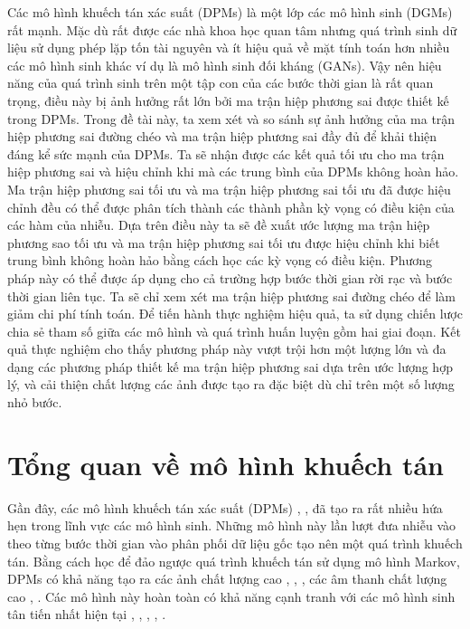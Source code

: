 \documentclass[14pt, a4paper]{article}
\numberwithin{equation}{section}
\numberwithin{figure}{section}
\numberwithin{dl}{section}
\numberwithin{md}{section}
\numberwithin{bd}{section}
\numberwithin{dn}{section}
\numberwithin{hq}{section}
\begin{document}
    Các mô hình khuếch tán xác suất (DPMs) là một lớp các mô hình sinh (DGMs) rất mạnh.
    Mặc dù rất được các nhà khoa học quan tâm nhưng quá trình sinh dữ liệu sử dụng phép lặp tốn tài nguyên và ít hiệu quả về mặt tính toán hơn nhiều các mô hình sinh khác ví dụ là mô hình sinh đối kháng (GANs).
    Vậy nên hiệu năng của quá trình sinh trên một tập con của các bước thời gian là rất quan trọng,
    điều này bị ảnh hưởng rất lớn bởi ma trận hiệp phương sai được thiết kế trong DPMs.
    Trong đề tài này, ta xem xét và so sánh sự ảnh hưởng của ma trận hiệp phương sai đường chéo và ma trận hiệp phương sai đầy đủ để khải thiện đáng kể sức mạnh của DPMs.
    Ta sẽ nhận được các kết quả tối ưu cho ma trận hiệp phương sai và hiệu chỉnh khi mà các trung bình của DPMs không hoàn hảo.
    Ma trận hiệp phương sai tối ưu và ma trận hiệp phương sai tối ưu đã được hiệu chỉnh đều có thể được phân tích thành các thành phần kỳ vọng có điều kiện của các hàm của nhiễu.
    Dựa trên điều này ta sẽ đề xuất ước lượng ma trận hiệp phương sao tối ưu và ma trận hiệp phương sai tối ưu được hiệu chỉnh khi biết trung bình không hoàn hảo bằng cách học các kỳ vọng có điều kiện.
    Phương pháp này có thể được áp dụng cho cả trường hợp bước thời gian rời rạc và bước thời gian liên tục.
    Ta sẽ chỉ xem xét ma trận hiệp phương sai đường chéo để làm giảm chi phí tính toán.
    Để tiến hành thực nghiệm hiệu quả, ta sử dụng chiến lược chia sẻ tham số giữa các mô hình và quá trình huấn luyện gồm hai giai đoạn.
    Kết quả thực nghiệm cho thấy phương pháp này vượt trội hơn một lượng lớn và đa dạng các phương pháp thiết kế ma trận hiệp phương sai dựa trên ước lượng hợp lý,
    và cải thiện chất lượng các ảnh được tạo ra đặc biệt dù chỉ trên một số lượng nhỏ bước.
    

        
    \newpage

    \section{Tổng quan về mô hình khuếch tán}

    Gần đây, các mô hình khuếch tán xác suất (DPMs) \cite{sohl2015deep}, \cite{ho2020denoising}, \cite{song2020score} đã tạo ra rất nhiều hứa hẹn trong lĩnh vực các mô hình sinh.
    Những mô hình này lần lượt đưa nhiễu vào theo từng bước thời gian vào phân phối dữ liệu gốc tạo nên một quá trình khuếch tán.
    Bằng cách học để đảo ngược quá trình khuếch tán sử dụng mô hình Markov, DPMs có khả năng tạo ra các ảnh chất lượng cao \cite{ho2020denoising}, \cite{song2020score}, \cite{dhariwal2021diffusion},
    các âm thanh chất lượng cao \cite{chen2020wavegrad}, \cite{kong2020diffwave}. 
    Các mô hình này hoàn toàn có khả năng cạnh tranh với các mô hình sinh tân tiến nhất hiện tại \cite{brock2018large}, \cite{wu2019logan}, \cite{karras2020analyzing}, \cite{binkowski2019high}, \cite{kalchbrenner2018efficient}.
\end{document}
